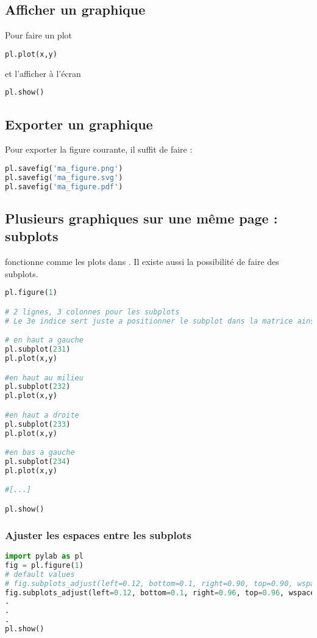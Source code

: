\documentclass[a4paper,twoside]{article}
\begin{document}
\subsection{Afficher un graphique}
Pour faire un plot
\begin{lstlisting}[language=python]
pl.plot(x,y)
\end{lstlisting}
et l'afficher à l'écran
\begin{lstlisting}[language=python]
pl.show()
\end{lstlisting}

\subsection{Exporter un graphique}
Pour exporter la figure courante, il suffit de faire :
\begin{lstlisting}[language=python]
pl.savefig('ma_figure.png')
pl.savefig('ma_figure.svg')
pl.savefig('ma_figure.pdf')
\end{lstlisting}

\subsection{Plusieurs graphiques sur une même page : subplots}
 fonctionne comme les plots dans . Il existe aussi la possibilité de faire des subplots.
\begin{lstlisting}[language=python]
pl.figure(1)

# 2 lignes, 3 colonnes pour les subplots
# Le 3e indice sert juste a positionner le subplot dans la matrice ainsi creee

# en haut a gauche
pl.subplot(231)
pl.plot(x,y)

#en haut au milieu
pl.subplot(232)
pl.plot(x,y)

#en haut a droite
pl.subplot(233)
pl.plot(x,y)

#en bas a gauche
pl.subplot(234)
pl.plot(x,y)

#[...]

pl.show()
\end{lstlisting}

\subsubsection{Ajuster les espaces entre les subplots}
\begin{lstlisting}[language=python]
import pylab as pl
fig = pl.figure(1)
# default values
# fig.subplots_adjust(left=0.12, bottom=0.1, right=0.90, top=0.90, wspace=0.20, hspace=0.20)
fig.subplots_adjust(left=0.12, bottom=0.1, right=0.96, top=0.96, wspace=0.26, hspace=0.26)
.
.
.
pl.show()
\end{lstlisting}
\end{document}
